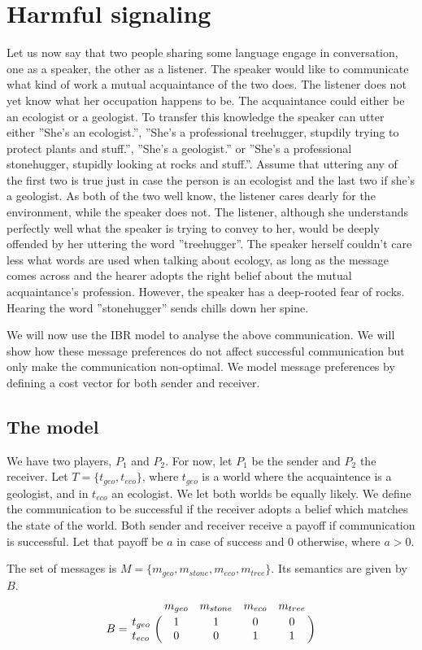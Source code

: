 \documentclass[10pt]{article}
\begin{document}
\section{Harmful signaling}
Let us now say that two people sharing some language engage in conversation, one as a speaker, the other as a listener. The speaker would like to communicate what kind of work a mutual acquaintance of the two does. The listener does not yet know what her occupation happens to be. The acquaintance could either be an ecologist or a geologist. To transfer this knowledge the speaker can utter either ''She's an ecologist.'', ''She's a professional treehugger, stupdily trying to protect plants and stuff.'', ''She's a geologist.'' or ''She's a professional stonehugger, stupidly looking at rocks and stuff.''. Assume that uttering any of the first two is true just in case the person is an ecologist and the last two if she's a geologist. As both of the two well know, the listener cares dearly for the environment, while the speaker does not. The listener, although she understands perfectly well what the speaker is trying to convey to her, would be deeply offended by her uttering the word ''treehugger''. The speaker herself couldn't care less what words are used when talking about ecology, as long as the message comes across and the hearer adopts the right belief about the mutual acquaintance's profession. However, the speaker has a deep-rooted fear of rocks. Hearing the word ''stonehugger'' sends chills down her spine.

We will now use the IBR model to analyse the above communication. We will show how these message preferences do not affect successful communication but only make the communication non-optimal. We model message preferences by defining a cost vector for both sender and receiver.
\subsection{The model}
We have two players, $P_1$ and $P_2$. For now, let $P_1$ be the sender and $P_2$ the receiver. Let $T=\{t_{geo}, t_{eco}\}$, where $t_{geo}$ is a world where the acquaintence is a geologist, and in $t_{eco}$ an ecologist. We let both worlds be equally likely. We define the communication to be successful if the receiver adopts a belief which matches the state of the world. Both sender and receiver receive a payoff if communication is successful. Let that payoff be $a$ in case of success and 0 otherwise, where $a>0$.

The set of messages is $M=\{m_{geo}, m_{stone}, m_{eco}, m_{tree}\}$. Its semantics are given by $B$.
 \begin{equation*}
 B =
 \bordermatrix{
            & m_{geo} & m_{stone} & m_{eco} & m_{tree}    \cr
   t_{geo}  &       1 &         1 & 0       & 0 \cr
   t_{eco}  &       0 &         0 & 1       & 1
 }
 \end{equation*}
\end{document}
